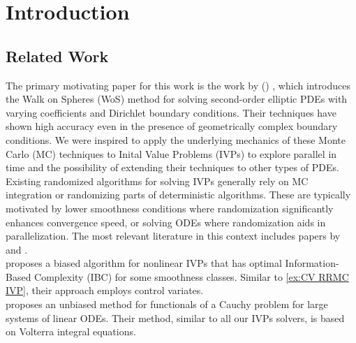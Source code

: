 \documentclass[a4paper,12pt]{article}
\begin{document}


\newpage
\tableofcontents
\newpage

\begin{abstract}
  
\end{abstract}


\section{Introduction}

\subsection{Related Work}
The primary motivating paper for this work is the work
by \citeauthor{sawhney_grid-free_2022}
(\citeyear{sawhney_grid-free_2022}) \cite{sawhney_grid-free_2022},
which introduces the Walk on Spheres (WoS) method for solving second-order
elliptic PDEs with varying coefficients and Dirichlet boundary conditions.
Their techniques have shown high accuracy even in the presence of geometrically
complex boundary conditions. We were inspired to apply the underlying
mechanics of these Monte Carlo (MC) techniques to Inital Value Problems (IVPs) to explore
parallel in time and the possibility of extending their techniques
to other types of PDEs. \\


Existing randomized algorithms for solving IVPs generally rely on MC integration or randomizing parts
of deterministic algorithms. These are typically motivated by lower smoothness conditions where randomization
significantly enhances convergence speed, or solving ODEs where randomization aids in parallelization.
The most relevant literature in this context includes papers by
\citeauthor{daun_randomized_2011} and \citeauthor{ermakov_monte_2021}. \\


\citeauthor{daun_randomized_2011} \citeyear{daun_randomized_2011} \cite{daun_randomized_2011}
proposes a biased algorithm for nonlinear IVPs that has optimal Information-Based Complexity (IBC) for
some smoothness classes. Similar to \ref{ex:CV RRMC IVP}, their approach employs control variates. \\

\citeauthor{ermakov_monte_2021} \citeyear{ermakov_monte_2021} \cite{ermakov_monte_2021} proposes
an unbiased method for functionals of a Cauchy problem for large systems of linear ODEs. Their method, similar
to all our IVPs solvers, is based on Volterra integral equations.
\end{document}
